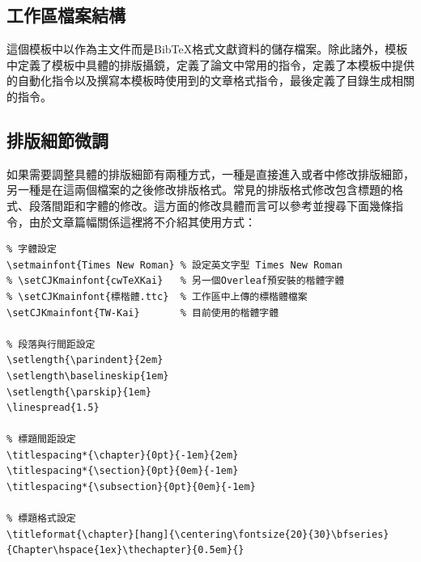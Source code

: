 \documentclass[12pt]{report}
\theoremstyle{plain}
\begin{document}
\subsection{工作區檔案結構}

這個模板中以作為主文件而是BibTeX格式文獻資料的儲存檔案。除此諸外，模板中定義了模板中具體的排版攝鏡，定義了論文中常用的指令，定義了本模板中提供的自動化指令以及撰寫本模板時使用到的文章格式指令，最後定義了目錄生成相關的指令。

\subsection{排版細節微調}

如果需要調整具體的排版細節有兩種方式，一種是直接進入或者中修改排版細節，另一種是在這兩個檔案的之後修改排版格式。常見的排版格式修改包含標題的格式、段落間距和字體的修改。這方面的修改具體而言可以參考並搜尋下面幾條指令，由於文章篇幅關係這裡將不介紹其使用方式：
\begin{lstlisting}
% 字體設定
\setmainfont{Times New Roman} % 設定英文字型 Times New Roman
% \setCJKmainfont{cwTeXKai}   % 另一個Overleaf預安裝的楷體字體
% \setCJKmainfont{標楷體.ttc}  % 工作區中上傳的標楷體檔案
\setCJKmainfont{TW-Kai}       % 目前使用的楷體字體

% 段落與行間距設定
\setlength{\parindent}{2em}
\setlength\baselineskip{1em}
\setlength{\parskip}{1em}
\linespread{1.5} 

% 標題間距設定
\titlespacing*{\chapter}{0pt}{-1em}{2em}
\titlespacing*{\section}{0pt}{0em}{-1em}
\titlespacing*{\subsection}{0pt}{0em}{-1em}

% 標題格式設定
\titleformat{\chapter}[hang]{\centering\fontsize{20}{30}\bfseries}{Chapter\hspace{1ex}\thechapter}{0.5em}{}
\end{lstlisting}
\end{document}
